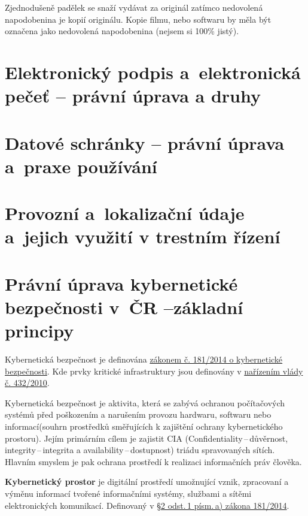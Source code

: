 Zjednodušeně padělek se snaží vydávat za originál zatímco nedovolená napodobenina je kopií originálu. Kopie filmu, nebo softwaru by měla být označena jako nedovolená napodobenina (nejsem si 100\% jistý).



\clearpage
\section[Elektronický podpis a~elektronická pečeť -- právní úprava a~druhy]{Elektronický podpis a~elektronická pečeť -- \newline právní úprava a druhy}

\clearpage
\section{Datové schránky -- právní úprava a~praxe používání}

\clearpage
\section{Provozní a~lokalizační údaje a~jejich využití v trestním řízení}

\clearpage
\section[Právní úprava kybernetické bezpečnosti v ČR -- základní principy]{Právní úprava kybernetické bezpečnosti v~ČR --\newline základní principy}

Kybernetická bezpečnost je definována \href{https://www.zakonyprolidi.cz/cs/2014-181}{zákonem č. 181/2014 o kybernetické bezpečnosti}. Kde prvky kritické infrastruktury jsou definovány v \href{https://www.zakonyprolidi.cz/cs/2010-432}{nařízením vlády č. 432/2010}.

Kybernetická bezpečnost je aktivita, která se zabývá ochranou počítačových systémů před poškozením a narušením provozu hardwaru, softwaru nebo informací(souhrn prostředků směřujících k zajištění ochrany kybernetického prostoru). Jejím primárním cílem je zajistit CIA (Confidentiality\,--\,důvěrnost, integrity\,--\,integrita a availability\,--\,dostupnost) triádu spravovaných sítích. Hlavním smyslem je pak ochrana prostředí k realizaci informačních práv člověka.

\textbf{Kybernetický prostor} je digitální prostředí umožnující vznik, zpracovaní a výměnu informací tvořené informačními systémy, službami a sítěmi elektronických komunikací. Definovaný v  \href{https://www.zakonyprolidi.cz/cs/2014-181#p2-1-a}{§2 odst.\,1 písm.\,a) zákona 181/2014}.


